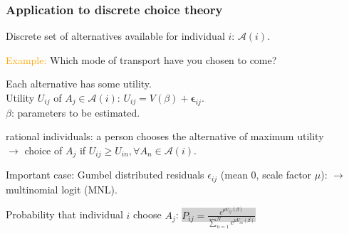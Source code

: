 \documentclass[aspectratio=169]{beamer}
\begin{document}
\begin{frame}[fragile]
\frametitle{Application to discrete choice theory}
		
			Discrete {\blue set of alternatives} available for individual $i$:
			$\mathcal{A}(i)$.
			
			\textcolor{orange}{Example:} Which mode of transport have you chosen to come?

			\vspace*{0.3cm}

			\begin{minipage}[c]{0.3\linewidth}
				\begin{center}
				\end{center}%
			\end{minipage}
			\begin{minipage}{0.68\linewidth}
				
				Each alternative has some utility.\\
				{\red Utility $U_{ij}$} of $A_j \in \mathcal{A}(i)$:
				$U_{i j} = V(\beta) + \boldsymbol{\epsilon}_{ij}.$\\
				$\beta$: parameters to be estimated.
				
				{\red rational individuals}: a person chooses
				the alternative of {\blue maximum utility}\\
				{\red $\rightarrow$} choice of $A_j$ if $U_{ij} \geq U_{in}, \forall A_n \in
				\mathcal{A}(i)$.
				
			\end{minipage}
			
				Important case: Gumbel distributed residuals $\epsilon_{ij}$ (mean 0,
				scale factor $\mu$):
				{\red $\rightarrow$ multinomial logit} (MNL).
				
				{\blue Probability} that individual $i$ choose $A_j$:
					\colorbox{lightgray}{
					$P_{ij} = \frac{e^{\mu V_{ij}(\beta)}}{\sum_{n= 1}^N e^{\mu
							V_{in}(\beta)}}$
					}
		
\end{frame}
\end{document}

